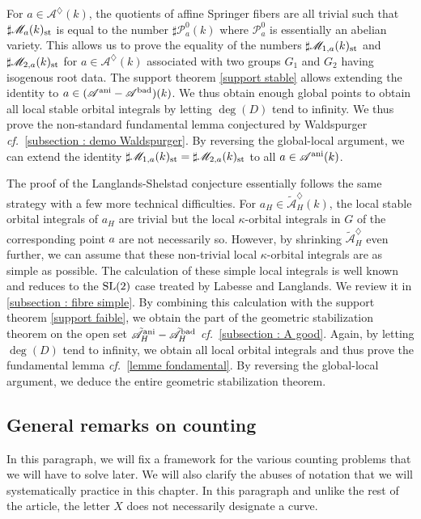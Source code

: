 \documentclass[12pt,english]{smfart}
\numberwithin{equation}{subsection}
\theoremstyle{remark}
\newcommand\calA{{\mathscr A}}
\newcommand\calP{{\mathscr P}}
\newcommand\calM{{\mathscr M}}
\newcommand\cf{{\it cf.\ }}
\newcommand\ani{{\rm ani}}
\begin{document}
For $a\in \calA^\diamondsuit(k)$, the quotients of affine Springer fibers are all trivial such that $\sharp \calM_a(k)_{\rm st}$ is equal to the number $\sharp \calP_a^0(k)$ where $\calP_a^0$ is essentially an abelian variety. This allows us to prove the equality of the numbers $\sharp \calM_{1,a}(k)_{\rm st}$ and $\sharp \calM_{2,a}(k)_{\rm st}$ for $a\in\calA^\diamondsuit(k)$ associated with two groups $G_1$ and $G_2$ having isogenous root data. The support theorem \ref{support stable} allows extending the identity to $a\in (\calA^{\rm ani}-\calA^{\rm bad})(k)$. We thus obtain enough global points to obtain all local stable orbital integrals by letting $\deg(D)$ tend to infinity. We thus prove the non-standard fundamental lemma conjectured by Waldspurger \cf \ref{subsection : demo Waldspurger}. By reversing the global-local argument, we can extend the identity $\sharp \calM_{1,a}(k)_{\rm st}=\sharp \calM_{2,a}(k)_{\rm st}$ to all $a\in\calA^\ani(k)$.

The proof of the Langlands-Shelstad conjecture essentially follows the same strategy with a few more technical difficulties. For $a_H\in\tilde\calA_H^\diamondsuit(k)$, the local stable orbital integrals of $a_H$ are trivial but the local $\kappa$-orbital integrals in $G$ of the corresponding point $a$ are not necessarily so. However, by shrinking $\tilde\calA_H^\diamondsuit$ even further, we can assume that these non-trivial local $\kappa$-orbital integrals are as simple as possible. The calculation of these simple local integrals is well known and reduces to the ${\rm SL}(2)$ case treated by Labesse and Langlands. We review it in \ref{subsection : fibre simple}. By combining this calculation with the support theorem \ref{support faible}, we obtain the part of the geometric stabilization theorem on the open set $\tilde\calA^\ani_H-\tilde\calA^{\rm bad}_H$ \cf \ref{subsection : A good}. Again, by letting $\deg(D)$ tend to infinity, we obtain all local orbital integrals and thus prove the fundamental lemma \cf \ref{lemme fondamental}. By reversing the global-local argument, we deduce the entire geometric stabilization theorem.

\subsection{General remarks on counting}\label{subsection : comptage}

In this paragraph, we will fix a framework for the various
counting problems that we will have to solve later. We
will also clarify the abuses of notation that we will
systematically practice in this chapter. In this
paragraph and unlike the rest of the article, the letter $X$ does not necessarily designate
a curve.
\end{document}
